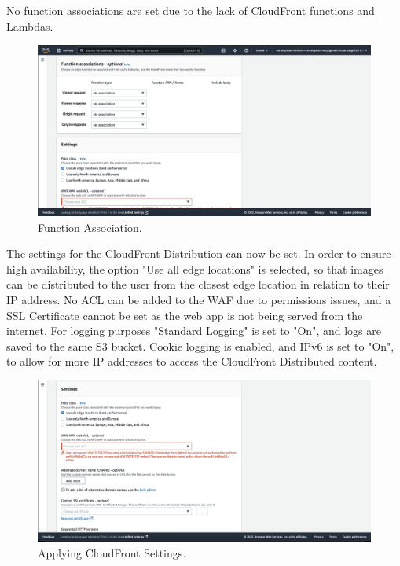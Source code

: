 No function associations are set due to the lack of CloudFront functions and Lambdas.

\begin{figure}[!htbp]
    \centering
    \includegraphics[width=\textwidth]{resources/cloudfront/cloudfront-function-association}
    \caption{Function Association.}
    \label{fig:cloudfront-function-association}
\end{figure}

The settings for the CloudFront Distribution can now be set.
In order to ensure high availability, the option "Use all edge locations" is selected, so that images can be distributed
to the user from the closest edge location in relation to their IP address.
No ACL can be added to the WAF due to permissions issues, and a SSL Certificate cannot be set as the web app is not being
served from the internet.
For logging purposes "Standard Logging" is set to "On", and logs are saved to the same S3 bucket.
Cookie logging is enabled, and IPv6 is set to "On", to allow for more IP addresses to access the CloudFront Distributed
content.

\begin{figure}[!htbp]
    \centering
    \includegraphics[width=\textwidth]{resources/cloudfront/cloudfront-settings-1}
    \caption{Applying CloudFront Settings.}
    \label{fig:cloudfront-settings-1}
\end{figure}

